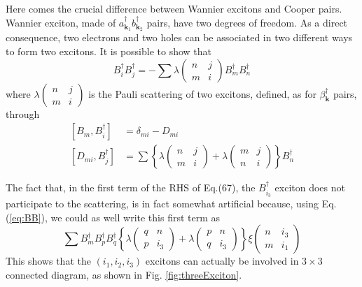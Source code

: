 \documentclass[epj]{svjour}
\newcommand{\vk}{\ensuremath{\mathbf{k}}}
\begin{document}
Here comes the crucial difference between Wannier excitons and Cooper pairs. Wannier exciton, made of $a^\dagger_{\vk_1}b^\dagger_{\vk_2}$ pairs, have two degrees of freedom. As a direct consequence,  two electrons and two holes can be associated in two different ways to form two excitons. It is possible to show \cite{CobosonPhysicsReports} that
\begin{equation}\label{eq:BB}
B^\dagger_iB^\dagger_j=-\sum\lambda\left(\begin{smallmatrix}n&j\\m&i\end{smallmatrix}%
\right)  B^{\dagger}_{m}B^{\dagger}_{n}
\end{equation}
where $\lambda\left(\begin{smallmatrix}n&j\\m&i\end{smallmatrix}\right)$  is the Pauli scattering of two excitons, defined, as for $\beta^\dagger_\vk$ pairs, through
\begin{equation}
\begin{split}
\left[B_m,B^{\dagger}_{i}\right]&=\delta_{mi}-D_{mi}\\
\left[D_{mi},B^{\dagger}_{j}\right]&=\sum\left\{\lambda\left(\begin{smallmatrix}n&j\\m&i\end{smallmatrix}\right)
+\lambda\left(\begin{smallmatrix}m&j\\n&i\end{smallmatrix}\right)\right\} B^{\dagger}_{n}
\end{split}
\end{equation}

The fact that, in the first term of the RHS of Eq.(67), the $B^\dagger_{i_3}$ exciton does not participate to the scattering, is in fact somewhat artificial because, using Eq.(\ref{eq:BB}), we could as well write this first term as
\begin{equation}\label{eq:3BLambdaXi}
\sum{}B^\dagger_mB^\dagger_pB^\dagger_q\left\{\lambda\left(\begin{smallmatrix}q&n\\p&i_3\end{smallmatrix}\right)
+\lambda\left(\begin{smallmatrix}p&n\\q&i_3\end{smallmatrix}\right)\right\} \xi\left(\begin{smallmatrix}n&i_3\\m&i_1\end{smallmatrix}\right)
\end{equation}
This shows that the $(i_1,i_2,i_3)$ excitons can actually be involved in $3\times3$ connected diagram, as shown in Fig. \ref{fig:threeExciton}.
\end{document}
